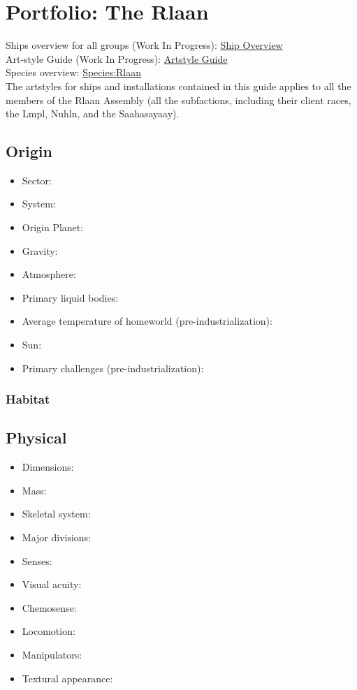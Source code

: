 \section{Portfolio: The Rlaan}
Ships overview for all groups (Work In Progress): \href{http://vegastrike.sourceforge.net/wiki/Artstyle\_guide:Overview\_Guide}{Ship Overview} \\
Art-style Guide (Work In Progress): \href{http://vegastrike.sourceforge.net/wiki/Artstyle\_guide:Rlaan}{Artstyle Guide} \\
Species overview: \href{http://vegastrike.sourceforge.net/wiki/Species:Rlaan}{Species:Rlaan} \\

The artstyles for ships and installations contained in this guide applies to all the members of the Rlaan Assembly (all the subfactions, including their client races, the Lmpl, Nuhln, and the Saahasayaay). 

\subsection{Origin}
\begin{itemize}
\item Sector: 
\item System: 
\item Origin Planet:  
\item Gravity: 
\item Atmosphere: 
\item Primary liquid bodies: 
\item Average temperature of homeworld (pre-industrialization):
\item Sun: 
\item Primary challenges (pre-industrialization): 
\end{itemize}


\subsubsection{Habitat}

\subsection{Physical}
\begin{itemize}
\item Dimensions: 
\item Mass: 
\item Skeletal system: 
\item Major divisions: 
\item Senses: 
\item Visual acuity: 
\item Chemosense: 
\item Locomotion: 
\item Manipulators: 
\item Textural appearance: 
\end{itemize}

